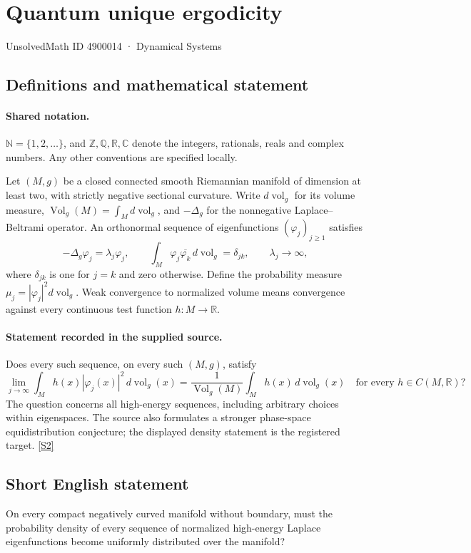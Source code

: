 \documentclass[11pt]{article}
\newcommand{\sref}[2]{\hyperlink{source:#1:#2}{[S#2]}}
\begin{document}
\setcounter{section}{4900013}
\section{Quantum unique ergodicity}\label{4900014}
{\small\sffamily UnsolvedMath ID 4900014 · Dynamical Systems}
\subsection{Definitions and mathematical statement}

\paragraph{Shared notation.}$\mathbb N=\{1,2,\ldots\}$, and $\mathbb Z,\mathbb Q,\mathbb R,\mathbb C$ denote the integers, rationals, reals and complex numbers. Any other conventions are specified locally.


Let $(M,g)$ be a closed connected smooth Riemannian manifold of dimension at least two, with strictly negative sectional curvature. Write $d\operatorname{vol}_g$ for its volume measure, $\operatorname{Vol}_g(M)=\int_M d\operatorname{vol}_g$, and $-\Delta_g$ for the nonnegative Laplace--Beltrami operator. An orthonormal sequence of eigenfunctions $(\varphi_j)_{j\geq1}$ satisfies
\[
-\Delta_g\varphi_j=\lambda_j\varphi_j,\qquad
\int_M\varphi_j\overline{\varphi_k}\,d\operatorname{vol}_g=\delta_{jk},\qquad \lambda_j\longrightarrow\infty,
\]
where $\delta_{jk}$ is one for $j=k$ and zero otherwise. Define the probability measure $\mu_j=|\varphi_j|^2d\operatorname{vol}_g$. Weak convergence to normalized volume means convergence against every continuous test function $h:M\to\mathbb R$.
\paragraph{Statement recorded in the supplied source.}
Does every such sequence, on every such $(M,g)$, satisfy
\[
\lim_{j\to\infty}\int_M h(x)|\varphi_j(x)|^2\,d\operatorname{vol}_g(x)
=\frac{1}{\operatorname{Vol}_g(M)}\int_M h(x)\,d\operatorname{vol}_g(x)
\quad\text{for every }h\in C(M,\mathbb R)?
\]
The question concerns all high-energy sequences, including arbitrary choices within eigenspaces. The source also formulates a stronger phase-space equidistribution conjecture; the displayed density statement is the registered target. \sref{4900014}{2}
\subsection{Short English statement}
On every compact negatively curved manifold without boundary, must the probability density of every sequence of normalized high-energy Laplace eigenfunctions become uniformly distributed over the manifold?
\end{document}
